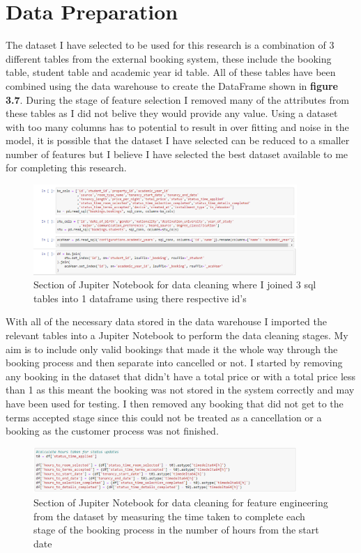 \section{Data Preparation}

The dataset I have selected to be used for this research is a combination of 3 different tables from the external booking system, these include the booking table, student table and academic year id table. All of these tables have been combined using the data warehouse to create the DataFrame shown in \textbf{figure 3.7}. During the stage of feature selection I removed many of the attributes from these tables as I did not belive they would provide any value. Using a dataset with too many columns has to potential to result in over fitting and noise in the model, it is possible that the dataset I have selected can be reduced to a smaller number of features but I believe I have selected the best dataset available to me for completing this research. 

\begin{figure}[hbt!]
 \includegraphics[width=10cm]{figures/joining_tables.png}
 \caption{Section of Jupiter Notebook for data cleaning where I joined 3 sql tables into 1 dataframe using there respective id's}
\end{figure}

With all of the necessary data stored in the data warehouse I imported the relevant tables into a Jupiter Notebook to perform the data cleaning stages. My aim is to include only valid bookings that made it the whole way through the booking process and then separate into cancelled or not. I started by removing any booking in the dataset that didn't have a total price or with a total price less than 1 as this meant the booking was not stored in the system correctly and may have been used for testing. I then removed any booking that did not get to the terms accepted stage since this could not be treated as a cancellation or a booking as the customer process was not finished.

\begin{figure}[hbt!]
 \includegraphics[width=10cm]{figures/time_variables.png}
 \caption{Section of Jupiter Notebook for data cleaning for feature engineering from the dataset by measuring the time taken to complete each stage of the booking process in the number of hours from the start date}
\end{figure}

